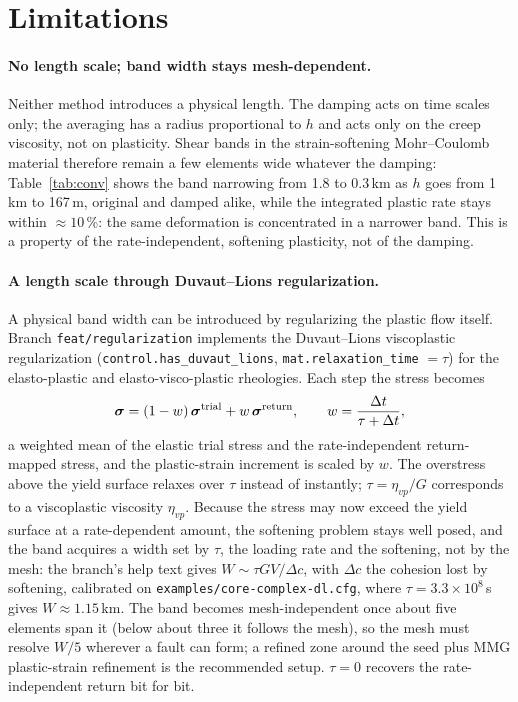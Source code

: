 \documentclass[11pt]{article}
\newcommand{\code}[1]{\texttt{#1}}
\begin{document}
\section{Limitations}
\label{sec:lim}

\paragraph{No length scale; band width stays mesh-dependent.} Neither method introduces a physical
length. The damping acts on time scales only; the averaging has a radius proportional to $h$ and
acts only on the creep viscosity, not on plasticity. Shear bands in the strain-softening
Mohr--Coulomb material therefore remain a few elements wide whatever the damping:
Table~\ref{tab:conv} shows the band narrowing from 1.8 to 0.3\,km as $h$ goes from 1\,km to
167\,m, original and damped alike, while the integrated plastic rate stays within $\approx10$\,\%:
the same deformation is concentrated in a narrower band. This is a property of the
rate-independent, softening plasticity, not of the damping.

\paragraph{A length scale through Duvaut--Lions regularization.} A physical band width can be
introduced by regularizing the plastic flow itself. Branch \code{feat/regularization} implements
the Duvaut--Lions viscoplastic regularization (\code{control.has\_duvaut\_lions},
\code{mat.relaxation\_time} $=\tau$) for the elasto-plastic and elasto-visco-plastic rheologies.
Each step the stress becomes
\begin{equation}
  \boldsymbol\sigma = (1-w)\,\boldsymbol\sigma^{\rm trial} + w\,\boldsymbol\sigma^{\rm return},
  \qquad w = \frac{\Delta t}{\tau+\Delta t},
\end{equation}
a weighted mean of the elastic trial stress and the rate-independent return-mapped stress, and the
plastic-strain increment is scaled by $w$. The overstress above the yield surface relaxes over
$\tau$ instead of instantly; $\tau=\eta_{vp}/G$ corresponds to a viscoplastic viscosity
$\eta_{vp}$. Because the stress may now exceed the yield surface at a rate-dependent amount, the
softening problem stays well posed, and the band acquires a width set by $\tau$, the loading rate
and the softening, not by the mesh: the branch's help text gives
$W\sim\tau G V/\Delta c$, with $\Delta c$ the cohesion lost by softening, calibrated on
\code{examples/core-complex-dl.cfg}, where $\tau=3.3\times10^8$\,s gives $W\approx1.15$\,km. The band
becomes mesh-independent once about five elements span it (below about three it follows the
mesh), so the mesh must resolve $W/5$ wherever a fault can form; a refined zone around the seed plus
MMG plastic-strain refinement is the recommended setup. $\tau=0$ recovers the rate-independent
return bit for bit.
\end{document}
